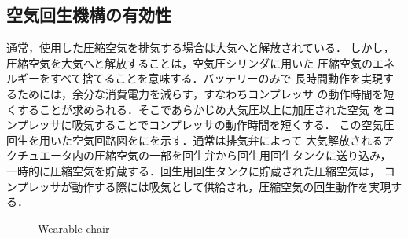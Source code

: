 \subsection{空気回生機構の有効性}
通常，使用した圧縮空気を排気する場合は大気へと解放されている．
しかし，圧縮空気を大気へと解放することは，空気圧シリンダに用いた
圧縮空気のエネルギーをすべて捨てることを意味する．バッテリーのみで
長時間動作を実現するためには，余分な消費電力を減らす，すなわちコンプレッサ
の動作時間を短くすることが求められる．そこであらかじめ大気圧以上に加圧された空気
をコンプレッサに吸気することでコンプレッサの動作時間を短くする．
この空気圧回生を用いた空気回路図をにを示す．通常は排気弁によって
大気解放されるアクチュエータ内の圧縮空気の一部を回生弁から回生用回生タンクに送り込み，
一時的に圧縮空気を貯蔵する．回生用回生タンクに貯蔵された圧縮空気は，
コンプレッサが動作する際には吸気として供給され，圧縮空気の回生動作を実現する．
\begin{figure}[t]%
        \begin{center}%
         \caption{Wearable chair}%
 \end{center}%
\end{figure}%
